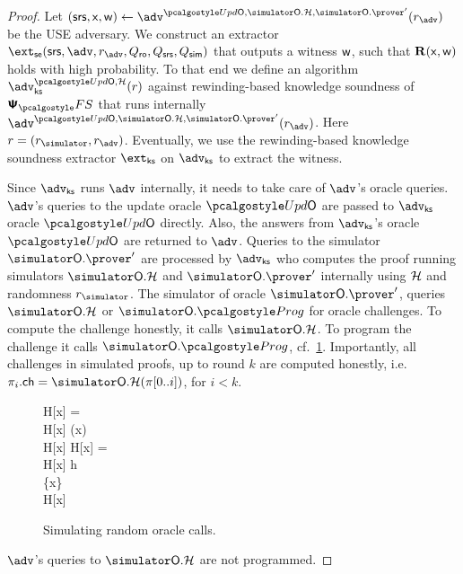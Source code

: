 \begin{proof}	
	Let $(\srs, \inp, \wit) \gets \advse^{\initU, \simOH, \simOP'}(r_{\advse})$ be the USE adversary. We construct an extractor $\extse (\srs, \advse, r_{\advse}, \Qro, \Qsrs, \Qsim)$ that outputs a witness $\mathsf{w}$, such that $\mathbf{R}(\mathsf{x}, \mathsf{w})$ holds with high probability. To that end we define an algorithm $\advcss^{\initU,\ro}(r)$ against rewinding-based knowledge soundness of $\psfs$ that runs internally $\advse^{\initU, \simOH, \simOP'}(r_{\advse})$. Here $r = (\rsim, r_{\advse})$. Eventually, we use the rewinding-based knowledge soundness extractor $\extcss$ on $\advcss$ to extract the witness.
	
	Since $\advcss$ runs $\advse$ internally, it needs to take care of $\advse$'s oracle queries.
	$\advse$'s queries to the update oracle $\initU$ are passed to $\advcss$ oracle $\initU$ directly. Also, the answers from $\advcss$'s oracle $\initU$ are returned to $\advse$.
	Queries to the simulator $\simOP'$ are processed by $\advcss$ who computes the proof running simulators $\simOH$ and $\simOP'$ internally using $\mathcal{H}$ and randomness $\rsim$. The simulator of oracle $\simOP'$, queries $\simOH$ or $\simOHprog$ for oracle challenges. To compute the challenge honestly, it calls $\simOH$. To program the challenge it calls $\simOHprog$, cf.~\cref{fig:simulator_oracles}. Importantly, all challenges in simulated proofs, up to round $k$ are computed honestly, i.e. $\zkproof_{i}.\ch = \simOH(\zkproof[0..i])$, for $i < k$.
	
	\begin{figure}
		\centering
			\begin{pcvstack}
			\begin{pchstack}
				{
				\pcif H[x] = \bot \pcthen \\
				\pcind H[x] \gets \ro(x) \\
				\pcreturn H[x]
		  		}
				\pchspace
				{ 
					\pcif H[x] = \bot \pcthen \\ 
					\pcind H[x] \gets h \\
					\pcind \Qprog \gets \Qprog \cup \{x\}\\
					\pcreturn H[x]
				}
			\end{pchstack}
		\end{pcvstack}
		\caption{Simulating random oracle calls.}
		\label{fig:simulator_oracles}
	\end{figure}	
%
	$\advse$'s queries to $\simOH$ are not programmed. 


\end{proof}
